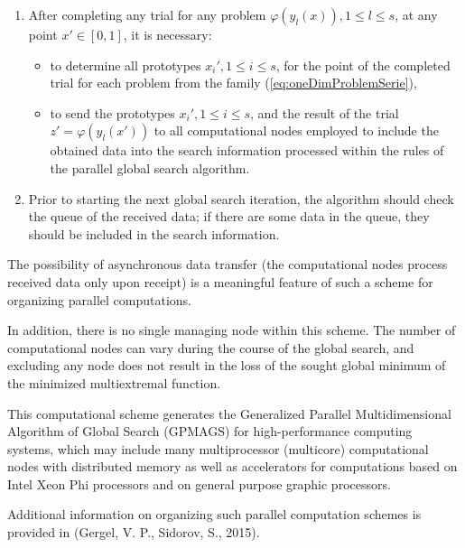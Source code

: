 \documentclass{gOMS2e}
\theoremstyle{plain}%
\theoremstyle{definition}
\theoremstyle{remark}
\begin{document}
\begin{enumerate}
\begin{enumerate}
    \item After completing any trial for any problem \(\varphi(y_l(x)),1\leqslant l\leqslant s\), at any point
    \(x'\in[0,1]\), it is necessary:
    \begin{itemize}
      \item to determine all prototypes \(x_i',1\leqslant i\leqslant s\), for the point of the completed trial
      for each problem from the family (\ref{eq:oneDimProblemSerie}),
      \item to send the prototypes \(x_i',1\leqslant i\leqslant s\), and the result of the
      trial \(z'=\varphi(y_l(x'))\) to all computational nodes employed to include the
      obtained data into the search information processed within the rules of the parallel global search algorithm.
    \end{itemize}
    \item Prior to starting the next global search iteration, the algorithm should
    check the queue of the received data; if there are some data in the queue,
    they should be included in the search information.
\end{enumerate}
\end{enumerate}
\par
The possibility of asynchronous data transfer (the computational nodes process received
data only upon receipt) is a meaningful feature of such a scheme for organizing parallel computations.
\par
In addition, there is no single managing node within this scheme. The number of
computational nodes can vary during the course of the global search, and excluding any
node does not result in the loss of the sought global minimum of the minimized multiextremal function.
\par
This computational scheme generates the Generalized Parallel Multidimensional Algorithm of
Global Search (GPMAGS) for high-performance computing systems, which may include many
multiprocessor (multicore) computational nodes with distributed memory as well as
accelerators for computations based on Intel Xeon Phi processors and on general purpose graphic processors.
\par
Additional information on organizing such parallel computation schemes is provided in (Gergel, V. P., Sidorov, S., 2015).
\end{document}
